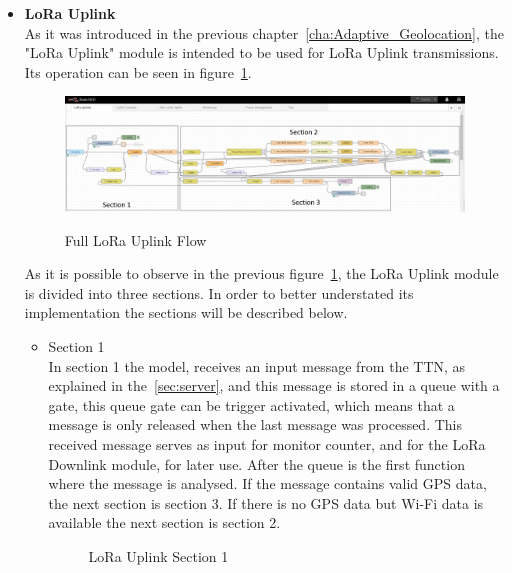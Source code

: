 \begin{itemize}
   \item \textbf{LoRa Uplink} \\
   As it was introduced in the previous chapter~\ref{cha:Adaptive_Geolocation}, the "LoRa Uplink" module is intended to be used for LoRa Uplink transmissions. Its operation can be seen in figure~\ref{fig:LoRa_Uplink}.
\begin{figure}[htbp]
  \centering
  
    {\includegraphics[width=\linewidth]{Chapters/Figures/LoRaUplink.png}}
 
  \caption{Full LoRa Uplink Flow}
  \label{fig:LoRa_Uplink}
\end{figure}
 
As it is possible to observe in the previous figure~\ref{fig:LoRa_Uplink}, the LoRa Uplink module is divided into three sections. In order to better understated its implementation the sections will be described below.

\begin{itemize}
  \item Section 1\\
    In section 1 the model, receives an input message from the TTN, as explained in the~\ref{sec:server}, and this message is stored in a queue with a gate, this queue gate can be trigger activated, which means that a message is only released when the last message was processed. This received message serves as input for monitor counter, and for the LoRa Downlink module, for later use. After the queue is the first function where the message is analysed. If the message contains valid GPS data, the next section is section 3. If there is no GPS data but Wi-Fi data is available the next section is section 2. 
    \begin{figure}[htbp]
      \centering
      \caption{LoRa Uplink  Section 1}
      \label{fig:LoRa_Uplink_Sec1}
    \end{figure}
\end{itemize}


\end{itemize}
